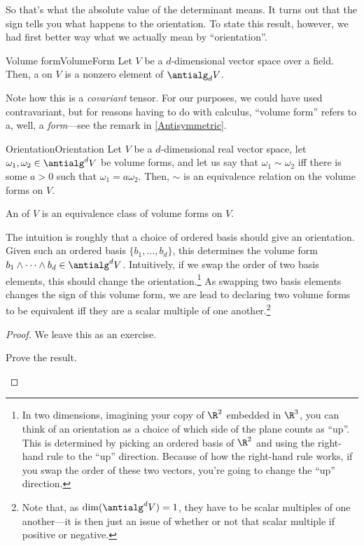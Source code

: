 So that's what the absolute value of the determinant means.  It turns out that the sign tells you what happens to the orientation.  To state this result, however, we had first better way what we actually mean by ``orientation''.
\begin{dfn}{Volume form\hfill}{VolumeForm}
	Let $V$ be a $d$-dimensional vector space over a field.  Then, a  on $V$ is a nonzero element of $\antialg _dV$.
	\begin{rmk}
		Note how this is a \emph{covariant} tensor.  For our purposes, we could have used contravariant, but for reasons having to do with calculus, ``volume form'' refers to a, well, a \emph{form}---see the remark in \cref{Antisymmetric}.
	\end{rmk}
\end{dfn}
\begin{prp}{Orientation\hfill}{Orientation}
	Let $V$ be a $d$-dimensional real vector space, let $\omega _1,\omega _2\in \antialg ^dV$ be volume forms, and let us say that $\omega _1\sim \omega _2$ iff there is some $a>0$ such that $\omega _1=a\omega _2$.  Then, $\sim$ is an equivalence relation on the volume forms on $V$.
	\begin{rmk}
		An  of $V$ is an equivalence class of volume forms on $V$.
	\end{rmk}
	\begin{rmk}
		The intuition is roughly that a choice of ordered basis should give an orientation.  Given such an ordered basis $\{ b_1,\ldots ,b_d\}$, this determines the volume form $b_1\wedge \cdots \wedge b_d\in \antialg ^dV$.  Intuitively, if we swap the order of two basis elements, this should change the orientation.\footnote{In two dimensions, imagining your copy of $\R ^2$ embedded in $\R ^3$, you can think of an orientation as a choice of which side of the plane counts as ``up''.  This is determined by picking an ordered basis of $\R ^2$ and using the right-hand rule to the ``up'' direction.  Because of how the right-hand rule works, if you swap the order of these two vectors, you're going to change the ``up'' direction.}  As swapping two basis elements changes the sign of this volume form, we are lead to declaring two volume forms to be equivalent iff they are a scalar multiple of one another.\footnote{Note that, as $\dim (\antialg ^dV)=1$, they have to be scalar multiples of one another---it is then just an issue of whether or not that scalar multiple if positive or negative.}
	\end{rmk}
	\begin{proof}
		We leave this as an exercise.
		\begin{exr}[breakable=false]{}{}
			Prove the result.
		\end{exr}
	\end{proof}
\end{prp}
